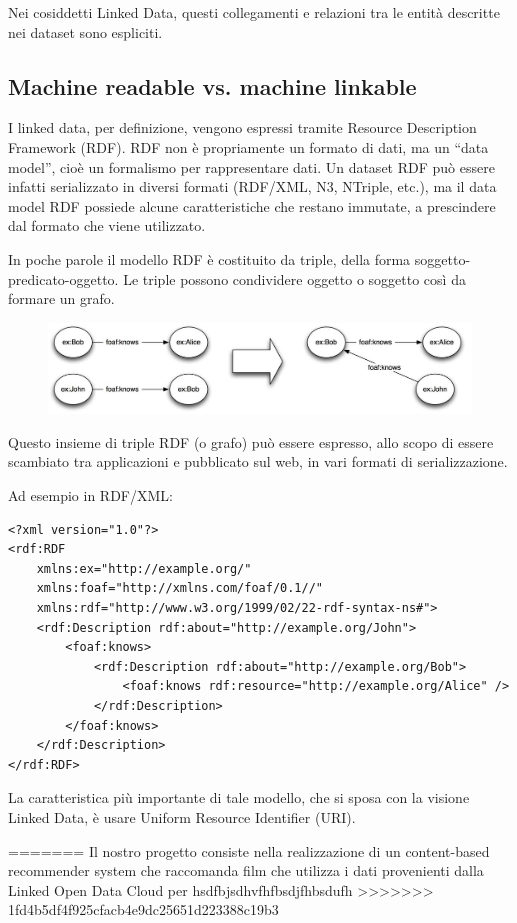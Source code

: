 Nei cosiddetti Linked Data, questi collegamenti e relazioni tra le entità descritte nei dataset sono espliciti.
\subsection{Machine readable vs. machine linkable}
I linked data, per definizione, vengono espressi tramite Resource Description Framework (RDF). RDF non è propriamente un formato di dati, ma un “data model”, cioè un formalismo per rappresentare dati. Un dataset RDF può essere infatti serializzato in diversi formati (RDF/XML, N3, NTriple, etc.), ma il data model RDF possiede alcune caratteristiche che restano immutate, a prescindere dal formato che viene utilizzato.

In poche parole il modello RDF è costituito da triple, della forma soggetto-predicato-oggetto. Le triple possono condividere oggetto o soggetto così da formare un grafo.

\begin{figure}[htbp]
  \centering
  \includegraphics[width=.9\textwidth]
    {./images/triples1-crop}
\end{figure}

Questo insieme di triple RDF (o grafo) può essere espresso, allo scopo di essere scambiato tra applicazioni e pubblicato sul web, in vari formati di serializzazione.

Ad esempio in RDF/XML:
\lstset{ basicstyle=\LSTfont, columns=fullflexible, xleftmargin=5mm, framexleftmargin=5mm, numbers=left, stepnumber=1, breaklines=true, breakatwhitespace=false, numberstyle=\footnotesize, numbersep=5pt, tabsize=2, frame=lines, captionpos=b}
\begin{lstlisting}
<?xml version="1.0"?>
<rdf:RDF
    xmlns:ex="http://example.org/"
    xmlns:foaf="http://xmlns.com/foaf/0.1//"
    xmlns:rdf="http://www.w3.org/1999/02/22-rdf-syntax-ns#">
    <rdf:Description rdf:about="http://example.org/John">
        <foaf:knows>
            <rdf:Description rdf:about="http://example.org/Bob">
                <foaf:knows rdf:resource="http://example.org/Alice" />
            </rdf:Description>
        </foaf:knows>
    </rdf:Description>
</rdf:RDF>
\end{lstlisting}
La caratteristica più importante di tale modello, che si sposa con la visione Linked Data, è usare Uniform Resource Identifier (URI).


=======
Il nostro progetto consiste nella realizzazione di un content-based recommender system che raccomanda film che utilizza i dati provenienti dalla Linked Open Data Cloud per hsdfbjsdhvfhfbsdjfhbsdufh
>>>>>>> 1fd4b5df4f925cfacb4e9dc25651d223388c19b3
